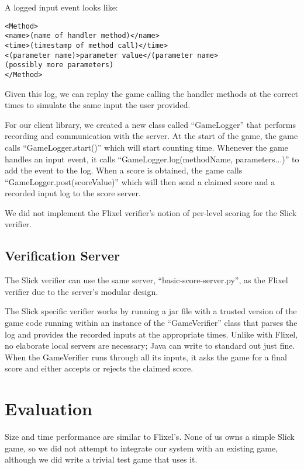 \documentclass [11pt, twocolumn] {article}
\begin{document}
A logged input event looks like:

\begin{verbatim}
<Method>
<name>(name of handler method)</name>
<time>(timestamp of method call)</time>
<(parameter name)>parameter value</(parameter name>
(possibly more parameters)
</Method>
\end{verbatim} 

Given this log, we can replay the game calling the handler methods at the correct times to simulate the same input the user provided.

For our client library, we created a new class called ``GameLogger'' that performs recording and communication with the server. At the start of the game, the game calls ``GameLogger.start()'' which will start counting time.  Whenever the game handles an input event, it calls ``GameLogger.log(methodName, parameters...)'' to add the event to the log.  When a score is obtained, the game calls ``GameLogger.post(scoreValue)'' which will then send a claimed score and a recorded input log to the score server.

We did not implement the Flixel verifier's notion of per-level scoring for the Slick verifier.

\subsection { Verification Server } 

The Slick verifier can use the same server, ``basic-score-server.py'', as the Flixel verifier due to the server's modular design.
 
The Slick specific verifier works by running a jar file with a trusted version of the game code running within an instance of the ``GameVerifier'' class that parses the log and provides the recorded inputs at the appropriate times.  Unlike with Flixel, no elaborate local servers are necessary; Java can write to standard out just fine.  When the GameVerifier runs through all its inputs, it asks the game for a final score and either accepts or rejects the claimed score.

\section { Evaluation } 
\label{sec:evaluation}

Size and time performance are similar to Flixel's.  None of us owns a simple Slick game, so we did not attempt to integrate our system with an existing game, although we did write a trivial test game that uses it.
\end{document}
